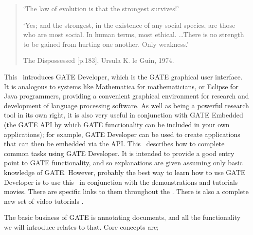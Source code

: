 
\nnormalsize
\ifprintedbook
\else
\begin{quote}
`The law of evolution is that the strongest survives!'

`Yes; and the strongest, in the existence of any social species, are
those who are most social. In human terms, most ethical.
\ldots There is no strength to be gained from
hurting one another. Only weakness.'

The Dispossessed [p.183], Ursula K. le Guin, 1974.
\end{quote}
\fi


This \chapthing\ introduces GATE Developer, which is the GATE graphical
user interface. It is analogous to systems like Mathematica for mathematicians,
or Eclipse for Java programmers, providing a convenient graphical environment
for research and development of language processing software. As well as being a
powerful research tool in its own right, it is also very useful in conjunction
with GATE Embedded (the GATE API by which GATE functionality can be included in
your own applications); for example, GATE Developer can be used to create
applications that can then be embedded via the API. This \chapthing\ describes
how to complete common tasks using GATE Developer. It is intended to provide a good
entry point to GATE functionality, and so explanations are given assuming only
basic knowledge of GATE. However, probably the best way to learn how to use GATE
Developer is to use this \chapthing\ in conjunction with the
 {demonstrations and tutorials
movies}. There are specific links to them throughout the \chapthing. There is
also a complete new set of video tutorials
.

The basic business of GATE is annotating documents, and all the functionality 
we will introduce relates to that. Core concepts are;

